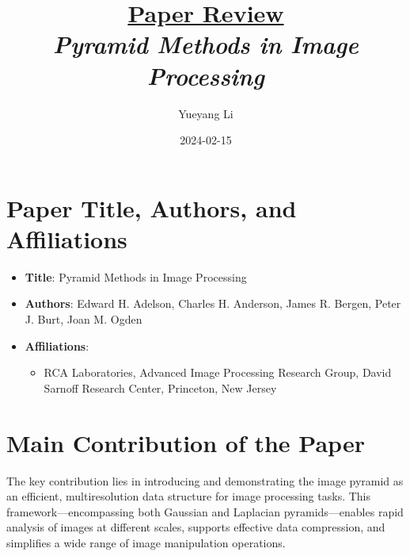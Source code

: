 \documentclass[12pt]{article}
\newcommand{\paperTitle}{
    \textit{\normalsize{Pyramid Methods in Image Processing}}
}
\begin{document}
\title{\Large\uline{\textbf{Paper Review}} \\[0.4em]
\paperTitle{} 
}
\author{Yueyang Li}
\date{2024-02-15}

\maketitle

\section{Paper Title, Authors, and Affiliations}
\begin{itemize}[noitemsep]
    \item \textbf{Title}: Pyramid Methods in Image Processing
    \item \textbf{Authors}: Edward H. Adelson, Charles H. Anderson, James R. Bergen, Peter J. Burt, Joan M. Ogden
    \item \textbf{Affiliations}:
    \begin{itemize}[noitemsep]
        \item RCA Laboratories, Advanced Image Processing Research Group, David Sarnoff Research Center, Princeton, New Jersey
    \end{itemize}
\end{itemize}

\section{Main Contribution of the Paper}
The key contribution lies in introducing and demonstrating the image pyramid as an efficient, multiresolution data structure for image processing tasks. This framework—encompassing both Gaussian and Laplacian pyramids—enables rapid analysis of images at different scales, supports effective data compression, and simplifies a wide range of image manipulation operations.
\end{document}
